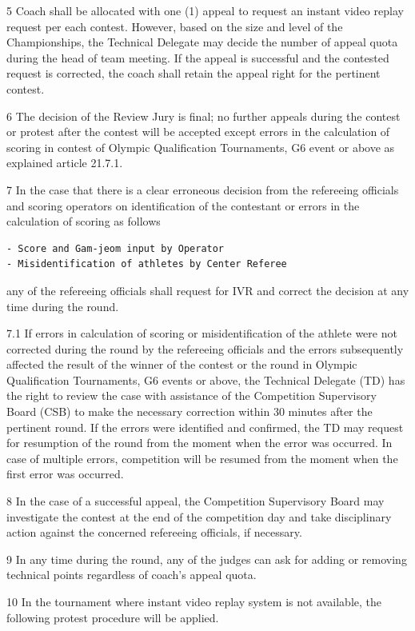 \documentclass[draft]{report}
\begin{document}
5 Coach shall be allocated with one (1) appeal to request an instant
video replay request per each contest. However, based on the size and
level of the Championships, the Technical Delegate may decide the number
of appeal quota during the head of team meeting. If the appeal is
successful and the contested request is corrected, the coach shall
retain the appeal right for the pertinent contest.

6 The decision of the Review Jury is final; no further appeals during
the contest or protest after the contest will be accepted except errors
in the calculation of scoring in contest of Olympic Qualification
Tournaments, G6 event or above as explained article 21.7.1.

7 In the case that there is a clear erroneous decision from the
refereeing officials and scoring operators on identification of the
contestant or errors in the calculation of scoring as follows

\begin{verbatim}
- Score and Gam-jeom input by Operator
- Misidentification of athletes by Center Referee
\end{verbatim}

any of the refereeing officials shall request for IVR and correct the
decision at any time during the round.

7.1 If errors in calculation of scoring or misidentification of the
athlete were not corrected during the round by the refereeing officials
and the errors subsequently affected the result of the winner of the
contest or the round in Olympic Qualification Tournaments, G6 events or
above, the Technical Delegate (TD) has the right to review the case with
assistance of the Competition Supervisory Board (CSB) to make the
necessary correction within 30 minutes after the pertinent round. If the
errors were identified and confirmed, the TD may request for resumption
of the round from the moment when the error was occurred. In case of
multiple errors, competition will be resumed from the moment when the
first error was occurred.

8 In the case of a successful appeal, the Competition Supervisory Board
may investigate the contest at the end of the competition day and take
disciplinary action against the concerned refereeing officials, if
necessary.

9 In any time during the round, any of the judges can ask for adding or
removing technical points regardless of coach's appeal quota.

10 In the tournament where instant video replay system is not available,
the following protest procedure will be applied.
\end{document}
